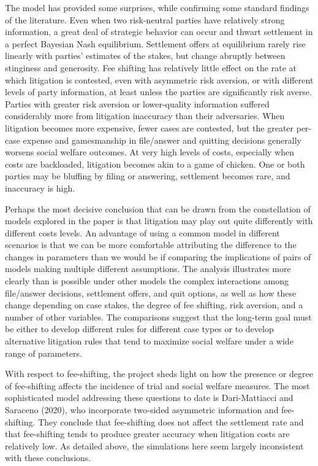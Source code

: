 \documentclass{article}
\begin{document}
The model has provided some surprises, while confirming some standard findings of the literature. Even when two risk-neutral parties have relatively strong information, a great deal of strategic behavior can occur and thwart settlement in a perfect Bayesian Nash equilibrium. Settlement offers at equilibrium rarely rise linearly with parties' estimates of the stakes, but change abruptly between stinginess and generosity. Fee shifting has relatively little effect on the rate at which litigation is contested, even with asymmetric risk aversion, or with different levels of party information, at least unless the parties are significantly risk averse. Parties with greater risk aversion or lower-quality information suffered considerably more from litigation inaccuracy than their adversaries.  When litigation becomes more expensive, fewer cases are contested, but the greater per-case expense and gamesmanship in file/answer and quitting decisions generally worsens social welfare outcomes. At very high levels of costs, especially when costs are backloaded, litigation becomes akin to a game of chicken. One or both parties may be bluffing by filing or answering, settlement becomes rare, and inaccuracy is high. 

Perhaps the most decisive conclusion that can be drawn from the constellation of models explored in the paper is that litigation may play out quite differently with different costs levels. An advantage of using a common model in different scenarios is that we can be more comfortable attributing the difference to the changes in parameters than we would be if comparing the implications of pairs of models making multiple different assumptions. The analysis illustrates more clearly than is possible under other models the complex interactions among file/answer decisions, settlement offers, and quit options, as well as how these change depending on case stakes, the degree of fee shifting, risk aversion, and a number of other variables. The comparisons suggest that the long-term goal must be either to develop different rules for different case types or to develop alternative litigation rules that tend to maximize social welfare under a wide range of parameters. 

With respect to fee-shifting, the project sheds light on how the presence or degree of fee-shifting affects the incidence of trial and social welfare measures. The most sophisticated model addressing these questions to date is Dari-Mattiacci and Saraceno (2020), who incorporate two-sided asymmetric information and fee-shifting. They conclude that fee-shifting does not affect the settlement rate and that fee-shifting tends to produce greater accuracy when litigation costs are relatively low. As detailed above, the simulations here seem largely inconsistent with these conclusions. 
\end{document}
